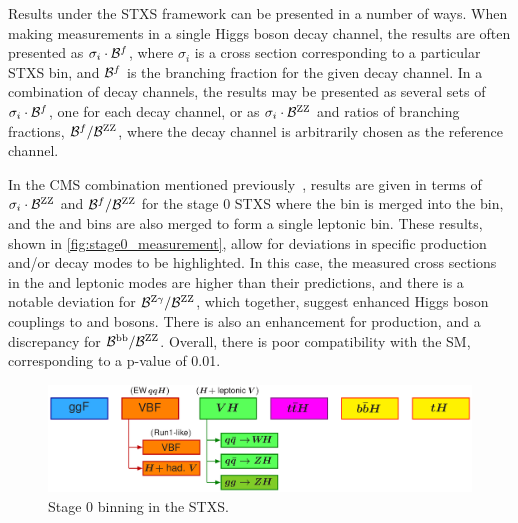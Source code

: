 Results under the STXS framework can be presented in a number of ways. When making measurements in a single Higgs boson decay channel, the results are often presented as $\sigma_i \cdot \mathcal{B}^f$, where $\sigma_i$ is a cross section corresponding to a particular STXS bin, and $\mathcal{B}^f$ is the branching fraction for the given decay channel. In a combination of decay channels, the results may be presented as several sets of $\sigma_i \cdot \mathcal{B}^f$, one for each decay channel, or as $\sigma_i \cdot \mathcal{B}^{\mathrm{Z}\mathrm{Z}}$ and ratios of branching fractions, $\mathcal{B}^f / \mathcal{B}^{\mathrm{Z}\mathrm{Z}}$, where the \HZZ decay channel is arbitrarily chosen as the reference channel.

In the CMS combination mentioned previously~\cite{CMS-PAS-HIG-21-018}, results are given in terms of $\sigma_i \cdot \mathcal{B}^{\mathrm{Z}\mathrm{Z}}$ and $\mathcal{B}^f / \mathcal{B}^{\mathrm{Z}\mathrm{Z}}$ for the stage 0 STXS where the \bbH bin is merged into the \ggH bin, and the \ggZH and \qqZH bins are also merged to form a single \ZH leptonic bin.  These results, shown in \cref{fig:stage0_measurement}, allow for deviations in specific production and/or decay modes to be highlighted. In this case, the measured cross sections in the \WH and \ZH leptonic modes are higher than their predictions, and there is a notable deviation for $\mathcal{B}^{\mathrm{Z}\gamma}/\mathcal{B}^{\mathrm{Z}\mathrm{Z}}$, which together, suggest enhanced Higgs boson couplings to \PW and \PZ bosons. There is also an enhancement for \tH production, and a discrepancy for $\mathcal{B}^{\mathrm{b}\mathrm{b}}/\mathcal{B}^{\mathrm{Z}\mathrm{Z}}$. Overall, there is poor compatibility with the SM, corresponding to a p-value of 0.01.

\begin{figure}[p]
  \centering
  \includegraphics[width=\textwidth]{Figures/Theory/Higgs/STXS/simplifiedXS_stage0.pdf}
  \caption[Stage 0 Binning in the STXS]{Stage 0 binning in the STXS.}\label{fig:stxs_stage0}
\end{figure}

